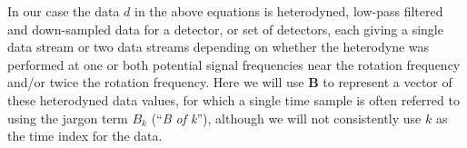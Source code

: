 In our case the data $d$ in the above equations is heterodyned, low-pass filtered and down-sampled data
for a detector, or set of detectors, each giving a single data stream or two data streams depending on
whether the heterodyne was performed at one or both potential signal frequencies near the rotation frequency
and/or twice the rotation frequency. Here we will use $\mathbf{B}$ to represent a vector of these heterodyned
data values, for which a single time sample is often referred to using the jargon term $B_k$ (``{\it B of k}''), although we will
not consistently use $k$ as the time index for the data.
